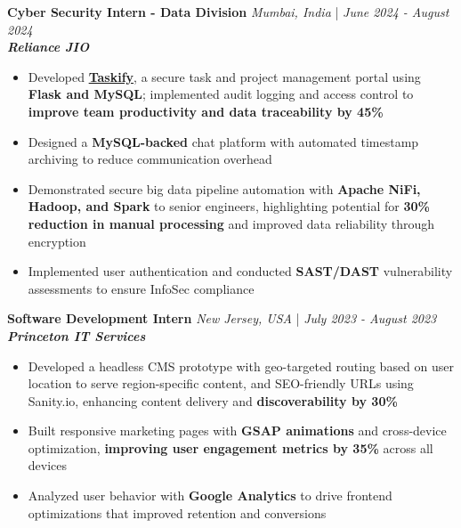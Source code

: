 \documentclass[a4paper]{article}
\begin{document}
\textbf{Cyber Security Intern - Data Division} \hfill  \textit{Mumbai, India} | \textit{June 2024 - August 2024} \\ 
\textit{\textbf{Reliance JIO}}
\vspace{-2.5mm}
\begin{itemize} \itemsep -4pt 
    \item Developed \textbf{\href{https://github.com/ShatakshiRanjan/JIOWebDesign}{Taskify}}, a secure task and project management portal using \textbf{Flask and MySQL}; implemented audit logging and access control to \textbf{improve team productivity and data traceability by 45\%}
    \item Designed a \textbf{MySQL-backed} chat platform with automated timestamp archiving to reduce communication overhead
    \item Demonstrated secure big data pipeline automation with \textbf{Apache NiFi, Hadoop, and Spark} to senior engineers, highlighting potential for \textbf{30\% reduction in manual processing} and improved data reliability through encryption
    \item Implemented user authentication and conducted \textbf{SAST/DAST} vulnerability assessments to ensure InfoSec compliance
\end{itemize}

\vspace{-2mm}
\textbf{Software Development Intern} \hfill \textit{New Jersey, USA} | \textit{July 2023 - August 2023} \\
\textit{\textbf{Princeton IT Services}}
\vspace{-2.5mm}
\begin{itemize} \itemsep -4pt
    \item Developed a headless CMS prototype with geo-targeted routing based on user location to serve region-specific content, and SEO-friendly URLs using Sanity.io, enhancing content delivery and \textbf{discoverability by 30\%}
    \item Built responsive marketing pages with \textbf{GSAP animations} and cross-device optimization, \textbf{improving user engagement metrics by 35\%} across all devices
    \item Analyzed user behavior with \textbf{Google Analytics} to drive frontend optimizations that improved retention and conversions 
\end{itemize}
\vspace{-2mm}
\end{document}
